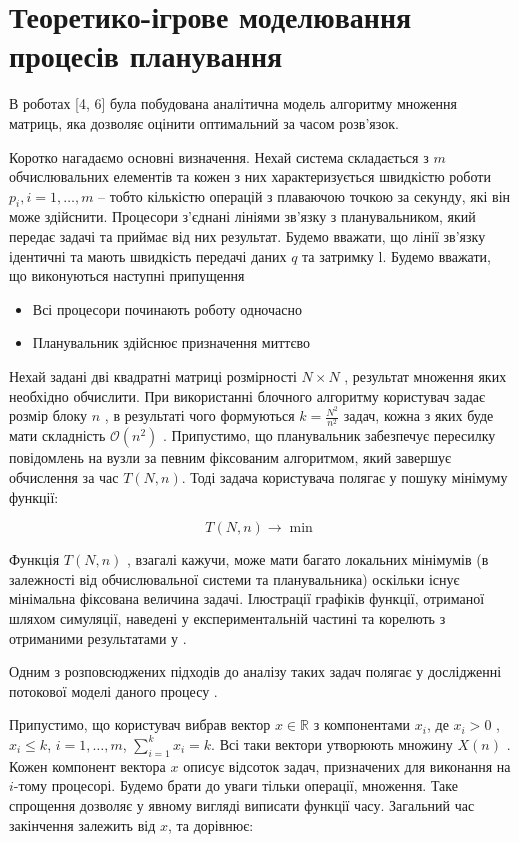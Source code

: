 \section{Теоретико-ігрове моделювання процесів планування}

В роботах [4, 6] була побудована аналітична модель алгоритму множення матриць, яка дозволяє оцінити оптимальний за часом розв’язок. 

Коротко нагадаємо основні визначення. Нехай система складається з $m$ обчислювальних елементів та кожен з них характеризується швидкістю роботи $p_i , i=1,\ldots,m$ – тобто кількістю операцій з плаваючою точкою за секунду, які він може здійснити. Процесори з’єднані лініями зв’язку з планувальником, який передає задачі та приймає від них результат. Будемо вважати, що лінії зв’язку ідентичні та мають швидкість передачі даних $q$ та затримку l. 
Будемо вважати, що виконуються наступні припущення
\begin{itemize}
	\item Всі процесори починають роботу одночасно
	\item Планувальник здійснює призначення миттєво
\end{itemize}

Нехай задані дві квадратні матриці розмірності $N \times N$ , результат множення яких необхідно обчислити. При використанні блочного алгоритму користувач задає розмір блоку $n$ , в результаті чого формуються $k=\frac{N^2}{n^2}$  задач, кожна з яких буде мати складність $\mathcal{O}(n^2)$ . Припустимо, що планувальник забезпечує пересилку повідомлень на вузли за певним фіксованим алгоритмом, який завершує обчислення за час $T(N,n)$. Тоді задача користувача полягає у пошуку мінімуму функції:

\begin{equation}
	\label{eq:general_minimization_problem}
	T(N,n) \longrightarrow \min
\end{equation}

Функція $T(N,n)$ , взагалі кажучи, може мати багато локальних мінімумів (в залежності від обчислювальної системи та планувальника) оскільки існує мінімальна фіксована величина задачі. Ілюстрації графіків функції, отриманої шляхом симуляції, наведені у експериментальній частині та корелють з отриманими результатами у \cite{DoroshenkoIgnatenkoIvanenko}.

Одним з розповсюджених підходів до аналізу таких задач полягає у дослідженні потокової моделі даного процесу \cite{FluidModelForJobScheduling}.

Припустимо, що користувач вибрав вектор $x \in \mathbb{R}$ з компонентами $x_i$, де $x_i > 0$ , $x_i \le k$, $i=1,\ldots,m$, $\sum_{i=1}^{k}x_i = k$. Всі таки вектори утворюють множину $X(n)$ . Кожен компонент вектора $x$ описує відсоток задач, призначених для виконання на  $i$-тому процесорі. Будемо брати до уваги тільки операції, множення. Таке спрощення дозволяє у явному вигляді виписати функції часу. Загальний час закінчення залежить від  $x$, та дорівнює:

